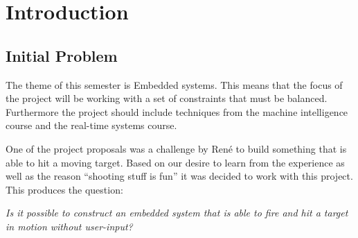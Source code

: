 \chapter{Introduction}

\section{Initial Problem}
The theme of this semester is Embedded systems. This means that the focus of
the project will be working with a set of constraints that must be balanced.
Furthermore the project should include techniques from the machine intelligence
course and the real-time systems course.\nl

One of the project proposals was a challenge by Ren\'e to build something that
is able to hit a moving target. Based on our desire to learn from the experience
as well as the reason ``shooting stuff is fun'' it was decided
to work with this project. This produces the question:\nl

\textit{Is it possible to construct an embedded system that is able to fire and hit
a target in motion without user-input?}
